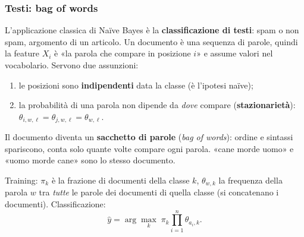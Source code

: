 \documentclass[12pt]{extarticle}
\begin{document}
\subsubsection{Testi: bag of words}

\noindent L'applicazione classica di Naïve Bayes è la \textbf{classificazione di testi}: spam o non spam, argomento di un articolo. Un documento è una sequenza di parole, quindi la feature $X_i$ è «la parola che compare in posizione $i$» e assume valori nel vocabolario. Servono due assunzioni:
\begin{enumerate}
    \item le posizioni sono \textbf{indipendenti} data la classe (è l'ipotesi naïve);
    \item la probabilità di una parola non dipende da \emph{dove} compare (\textbf{stazionarietà}): $\theta_{i,w,\ell}=\theta_{j,w,\ell}=\theta_{w,\ell}$.
\end{enumerate}
Il documento diventa un \textbf{sacchetto di parole} (\textit{bag of words}): ordine e sintassi spariscono, conta solo quante volte compare ogni parola. «cane morde uomo» e «uomo morde cane» sono lo stesso documento.

\noindent Training: $\pi_k$ è la frazione di documenti della classe $k$, $\theta_{w,k}$ la frequenza della parola $w$ tra \emph{tutte} le parole dei documenti di quella classe (si concatenano i documenti). Classificazione:
\[
\hat y = \arg\max_k\; \pi_k \prod_{i=1}^n \theta_{a_i,k} .
\]
\end{document}

